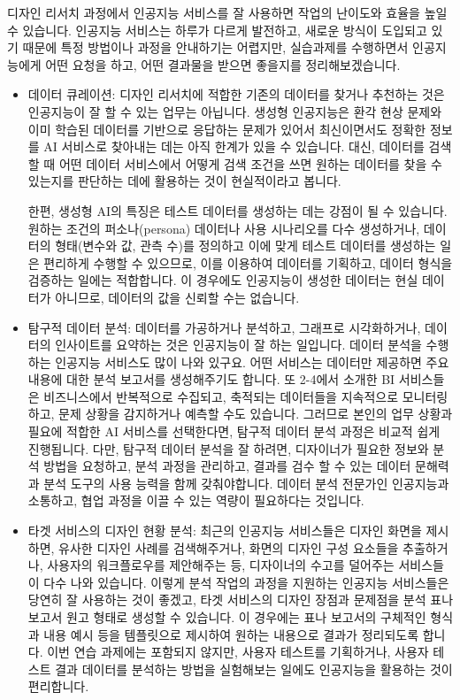 \documentclass[
  letterpaper,
]{book}
\begin{document}
디자인 리서치 과정에서 인공지능 서비스를 잘 사용하면 작업의 난이도와
효율을 높일 수 있습니다. 인공지능 서비스는 하루가 다르게 발전하고,
새로운 방식이 도입되고 있기 때문에 특정 방법이나 과정을 안내하기는
어렵지만, 실습과제를 수행하면서 인공지능에게 어떤 요청을 하고, 어떤
결과물을 받으면 좋을지를 정리해보겠습니다.

\begin{itemize}
\item
  데이터 큐레이션: 디자인 리서치에 적합한 기존의 데이터를 찾거나
  추천하는 것은 인공지능이 잘 할 수 있는 업무는 아닙니다. 생성형
  인공지능은 환각 현상 문제와 이미 학습된 데이터를 기반으로 응답하는
  문제가 있어서 최신이면서도 정확한 정보를 AI 서비스로 찾아내는 데는
  아직 한계가 있을 수 있습니다. 대신, 데이터를 검색할 때 어떤 데이터
  서비스에서 어떻게 검색 조건을 쓰면 원하는 데이터를 찾을 수 있는지를
  판단하는 데에 활용하는 것이 현실적이라고 봅니다.

  한편, 생성형 AI의 특징은 테스트 데이터를 생성하는 데는 강점이 될 수
  있습니다. 원하는 조건의 퍼소나(persona) 데이터나 사용 시나리오를 다수
  생성하거나, 데이터의 형태(변수와 값, 관측 수)를 정의하고 이에 맞게
  테스트 데이터를 생성하는 일은 편리하게 수행할 수 있으므로, 이를
  이용하여 데이터를 기획하고, 데이터 형식을 검증하는 일에는 적합합니다.
  이 경우에도 인공지능이 생성한 데이터는 현실 데이터가 아니므로,
  데이터의 값을 신뢰할 수는 없습니다.
\item
  탐구적 데이터 분석: 데이터를 가공하거나 분석하고, 그래프로
  시각화하거나, 데이터의 인사이트를 요약하는 것은 인공지능이 잘 하는
  일입니다. 데이터 분석을 수행하는 인공지능 서비스도 많이 나와 있구요.
  어떤 서비스는 데이터만 제공하면 주요 내용에 대한 분석 보고서를
  생성해주기도 합니다. 또 2-4에서 소개한 BI 서비스들은 비즈니스에서
  반복적으로 수집되고, 축적되는 데이터들을 지속적으로 모니터링하고, 문제
  상황을 감지하거나 예측할 수도 있습니다. 그러므로 본인의 업무 상황과
  필요에 적합한 AI 서비스를 선택한다면, 탐구적 데이터 분석 과정은 비교적
  쉽게 진행됩니다. 다만, 탐구적 데이터 분석을 잘 하려면, 디자이너가
  필요한 정보와 분석 방법을 요청하고, 분석 과정을 관리하고, 결과를 검수
  할 수 있는 데이터 문해력과 분석 도구의 사용 능력을 함께 갖춰야합니다.
  데이터 분석 전문가인 인공지능과 소통하고, 협업 과정을 이끌 수 있는
  역량이 필요하다는 것입니다.
\item
  타겟 서비스의 디자인 현황 분석: 최근의 인공지능 서비스들은 디자인
  화면을 제시하면, 유사한 디자인 사례를 검색해주거나, 화면의 디자인 구성
  요소들을 추출하거나, 사용자의 워크플로우를 제안해주는 등, 디자이너의
  수고를 덜어주는 서비스들이 다수 나와 있습니다. 이렇게 분석 작업의
  과정을 지원하는 인공지능 서비스들은 당연히 잘 사용하는 것이 좋겠고,
  타겟 서비스의 디자인 장점과 문제점을 분석 표나 보고서 원고 형태로
  생성할 수 있습니다. 이 경우에는 표나 보고서의 구체적인 형식과 내용
  예시 등을 템플릿으로 제시하여 원하는 내용으로 결과가 정리되도록
  합니다. 이번 연습 과제에는 포함되지 않지만, 사용자 테스트를
  기획하거나, 사용자 테스트 결과 데이터를 분석하는 방법을 실험해보는
  일에도 인공지능을 활용하는 것이 편리합니다.
\end{itemize}
\end{document}
